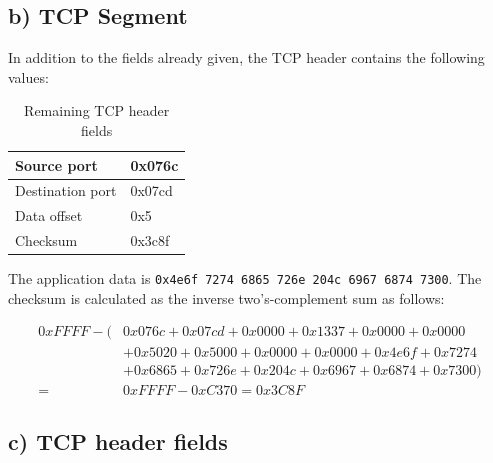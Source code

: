 \documentclass[a4paper, 11 pt, article, accentcolor=tud7b]{tudreport}
\begin{document}
	\subsection*{b) TCP Segment}
	
	In addition to the fields already given, the TCP header contains the following values:
	
	\begin{table}[h]
	  \centering
	  \begin{tabular}{|l|l|}
	    \hline
	    Source port & 0x076c \\ \hline
	    Destination port & 0x07cd \\ \hline
	    Data offset & 0x5 \\ \hline
	    Checksum & 0x3c8f \\ \hline
	  \end{tabular}
	  \caption{Remaining TCP header fields}
	\end{table}
	
	The application data is \verb|0x4e6f 7274 6865 726e 204c 6967 6874 7300|. The checksum is calculated as the inverse two's-complement sum as follows: 
	
	\begin{align*}
	  0xFFFF - (&0x076c + 0x07cd + 0x0000 + 0x1337 + 0x0000 + 0x0000 \\
	            &+ 0x5020 + 0x5000 + 0x0000 + 0x0000 + 0x4e6f + 0x7274 \\
	            &+ 0x6865 + 0x726e + 0x204c + 0x6967 + 0x6874 + 0x7300) \\
	          = &0xFFFF - 0xC370 = 0x3C8F
	\end{align*}
	
	\newpage
	
	\subsection*{c) TCP header fields}
	
\end{document}
